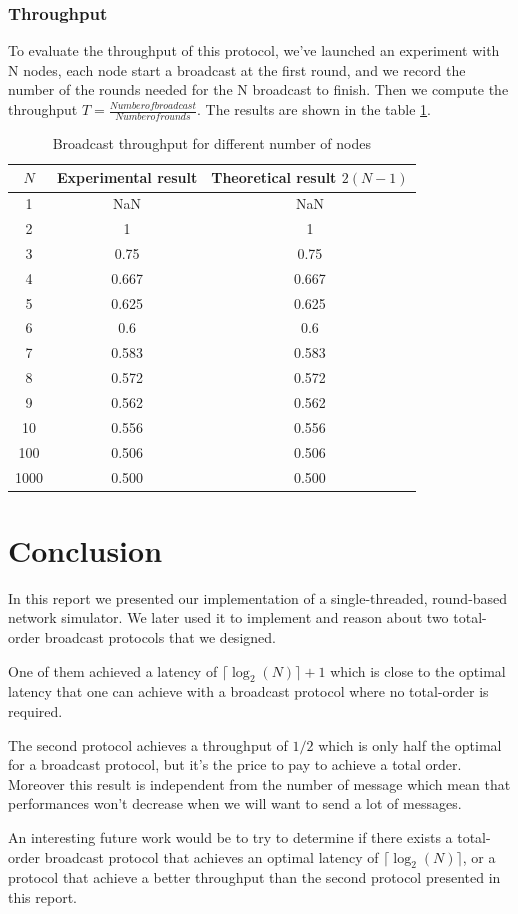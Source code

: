 \documentclass[a4paper]{article}
\begin{document}
\subsubsection{Throughput}
To evaluate the throughput of this protocol, we've launched an experiment with N
nodes, each node start a broadcast at the first round, and we record the number
of the rounds needed for the N broadcast to finish. Then we compute the
throughput $T=\frac{Number of broadcast}{Number of rounds}$. The results are
shown in the table \ref{table:thT}.
\begin{table}[H]
\centering
\begin{tabular}{|c|c|c|}
    \hline
    $N$  & Experimental result & Theoretical result $2(N-1)$ \\
    \hline
    1     & NaN    & NaN    \\
    2     & 1      & 1      \\
    3     & 0.75   &  0.75  \\
    4     & 0.667  & 0.667  \\
    5     & 0.625  & 0.625  \\
    6     & 0.6    &   0.6  \\
    7     & 0.583  & 0.583  \\
    8     & 0.572  & 0.572  \\
    9     & 0.562  & 0.562  \\
    10    & 0.556  & 0.556  \\
    100   & 0.506  & 0.506  \\
    1000  & 0.500  & 0.500  \\
    \hline
\end{tabular}
\caption{Broadcast throughput for different number of nodes}
\label{table:thT}
\end{table}

\section*{Conclusion}
In this report we presented our implementation of a single-threaded,
round-based network simulator. We later used it to implement and reason about
two total-order broadcast protocols that we designed.

One of them achieved a latency of $\lceil\log_2(N)\rceil + 1$ which is close
to the optimal latency that one can achieve with a broadcast protocol where no
total-order is required.

The second protocol achieves a throughput of $1/2$ which is only half the
optimal for a broadcast protocol, but it's the price to pay to achieve a total
order. Moreover this result is independent from the number of message which mean
that performances won't decrease when we will want to send a lot of messages.

An interesting future work would be to try to determine if there exists a
total-order broadcast protocol that achieves an optimal latency of
$\lceil\log_2(N)\rceil$, or a protocol that achieve a better throughput than
the second protocol presented in this report.
\end{document}
